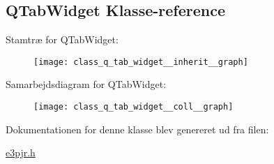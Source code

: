 \hypertarget{class_q_tab_widget}{}\subsection{Q\+Tab\+Widget Klasse-\/reference}
\label{class_q_tab_widget}


Stamtræ for Q\+Tab\+Widget\+:
\nopagebreak
\begin{figure}[H]
\begin{center}
\leavevmode
\texttt{[image: class\_q\_tab\_widget\_\_inherit\_\_graph]}
\end{center}
\end{figure}


Samarbejdsdiagram for Q\+Tab\+Widget\+:
\nopagebreak
\begin{figure}[H]
\begin{center}
\leavevmode
\texttt{[image: class\_q\_tab\_widget\_\_coll\_\_graph]}
\end{center}
\end{figure}


Dokumentationen for denne klasse blev genereret ud fra filen\+:\begin{DoxyCompactItemize}
\item 
\hyperlink{e3pjr_8h}{e3pjr.\+h}\end{DoxyCompactItemize}
